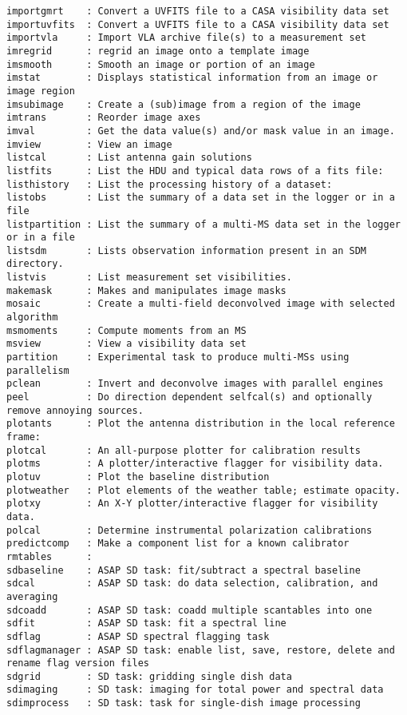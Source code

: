 \begin{verbatim}
importgmrt    : Convert a UVFITS file to a CASA visibility data set
importuvfits  : Convert a UVFITS file to a CASA visibility data set
importvla     : Import VLA archive file(s) to a measurement set
imregrid      : regrid an image onto a template image
imsmooth      : Smooth an image or portion of an image
imstat        : Displays statistical information from an image or image region
imsubimage    : Create a (sub)image from a region of the image
imtrans       : Reorder image axes
imval         : Get the data value(s) and/or mask value in an image.
imview        : View an image
listcal       : List antenna gain solutions
listfits      : List the HDU and typical data rows of a fits file:
listhistory   : List the processing history of a dataset:
listobs       : List the summary of a data set in the logger or in a file
listpartition : List the summary of a multi-MS data set in the logger or in a file
listsdm       : Lists observation information present in an SDM directory.
listvis       : List measurement set visibilities.
makemask      : Makes and manipulates image masks
mosaic        : Create a multi-field deconvolved image with selected algorithm
msmoments     : Compute moments from an MS
msview        : View a visibility data set
partition     : Experimental task to produce multi-MSs using parallelism
pclean        : Invert and deconvolve images with parallel engines
peel          : Do direction dependent selfcal(s) and optionally remove annoying sources.
plotants      : Plot the antenna distribution in the local reference frame:
plotcal       : An all-purpose plotter for calibration results 
plotms        : A plotter/interactive flagger for visibility data.
plotuv        : Plot the baseline distribution
plotweather   : Plot elements of the weather table; estimate opacity.
plotxy        : An X-Y plotter/interactive flagger for visibility data.
polcal        : Determine instrumental polarization calibrations
predictcomp   : Make a component list for a known calibrator
rmtables      : 
sdbaseline    : ASAP SD task: fit/subtract a spectral baseline 
sdcal         : ASAP SD task: do data selection, calibration, and averaging
sdcoadd       : ASAP SD task: coadd multiple scantables into one
sdfit         : ASAP SD task: fit a spectral line
sdflag        : ASAP SD spectral flagging task 
sdflagmanager : ASAP SD task: enable list, save, restore, delete and rename flag version files
sdgrid        : SD task: gridding single dish data
sdimaging     : SD task: imaging for total power and spectral data
sdimprocess   : SD task: task for single-dish image processing

\end{verbatim}
